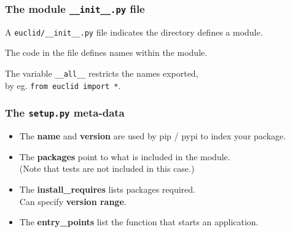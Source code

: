 \documentclass{beamer} %
\newcommand\emc[1]{\textcolor{brightblue}{\textbf{#1}}}
\begin{document}
\begin{frame}

\frametitle{The module \texttt{\_\_init\_\_.py} file}

A \texttt{euclid/\_\_init\_\_.py} file indicates the directory defines a module.

\vspace{5mm}
The code in the file defines names within the module.

\vspace{5mm}
The variable \texttt{\_\_all\_\_} restricts the names exported, \\ by eg. \texttt{from euclid import *}.
\end{frame}



\begin{frame}

\frametitle{The \texttt{setup.py} meta-data}

\begin{itemize}
  \item The \emc{name} and \emc{version} are used by pip / pypi to index your package.
  \item The \emc{packages} point to what is included in the module. \\ (Note that tests are not included in this case.)
  \item The \emc{install\_requires} lists packages required. \\ Can specify \emc{version range}. 
  \item The \emc{entry\_points} list the function that starts an application.
  \end{itemize}

\end{frame}
\end{document}
